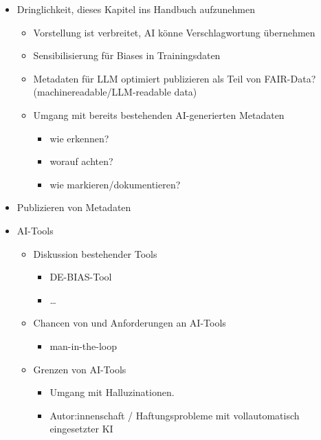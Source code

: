 \documentclass[
  letterpaper,
  DIV=11,
  numbers=noendperiod]{scrartcl}
\providecommand{\tightlist}{%
  \setlength{\itemsep}{0pt}\setlength{\parskip}{0pt}}\usepackage{longtable,booktabs,array}
\begin{document}
\begin{itemize}
\tightlist
\item
  Dringlichkeit, dieses Kapitel ins Handbuch aufzunehmen

  \begin{itemize}
  \tightlist
  \item
    Vorstellung ist verbreitet, AI könne Verschlagwortung übernehmen
  \item
    Sensibilisierung für Biases in Trainingsdaten
  \item
    Metadaten für LLM optimiert publizieren als Teil von FAIR-Data?
    (machinereadable/LLM-readable data)
  \item
    Umgang mit bereits bestehenden AI-generierten Metadaten

    \begin{itemize}
    \tightlist
    \item
      wie erkennen?
    \item
      worauf achten?
    \item
      wie markieren/dokumentieren?
    \end{itemize}
  \end{itemize}
\item
  Publizieren von Metadaten
\item
  AI-Tools

  \begin{itemize}
  \tightlist
  \item
    Diskussion bestehender Tools

    \begin{itemize}
    \tightlist
    \item
      DE-BIAS-Tool
    \item
      \ldots{}
    \end{itemize}
  \item
    Chancen von und Anforderungen an AI-Tools

    \begin{itemize}
    \tightlist
    \item
      man-in-the-loop
    \end{itemize}
  \item
    Grenzen von AI-Tools

    \begin{itemize}
    \tightlist
    \item
      Umgang mit Halluzinationen.
    \item
      Autor:innenschaft / Haftungsprobleme mit vollautomatisch
      eingesetzter KI
    \end{itemize}
  \end{itemize}
\end{itemize}
\end{document}
